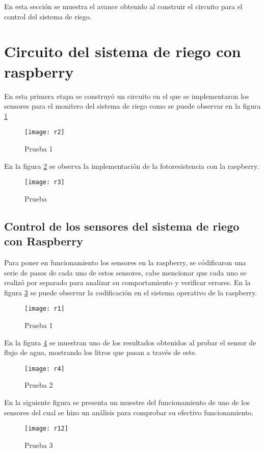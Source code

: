 En esta secci\'on se muestra el avance obtenido al construir el circuito para el control del sistema de riego.
\section{Circuito del sistema de riego con raspberry}
En esta primera etapa se construy\'o un circuito en el que se implementaron los sensores para el monitero del sistema de riego como se puede observar en la figura \ref{r2}

\begin{figure}[H]
	\begin{center}
		\texttt{[image: r2]}
	\end{center}
	\caption{Prueba 1}
	\label{r2}
\end{figure} 

En la figura \ref{r3} se observa la implementaci\'on de la fotoresistencia con la raspberry. 
\begin{figure}[H]
	\begin{center}
		\texttt{[image: r3]}
	\end{center}
	\caption{Prueba}
	\label{r3}
\end{figure} 


\subsection{Control de los sensores del sistema de riego con Raspberry}
Para poner en funcionamiento los sensores en la raspberry, se c\'odificaron una serie de pasos de cada uno de estos sensores, cabe mencionar que cada uno se realiz\'o por separado para analizar su comportamiento y verificar errores. En la figura \ref{r1} se puede observar la codificaci\'on en el sistema operativo de la raspberry.
\begin{figure}[H]
\begin{center}
	\texttt{[image: r1]}
\end{center}
	\caption{Prueba 1}
	\label{r1}
\end{figure} 

En la figura \ref{r4} se muestran uno de los resultados obtenidos al probar el sensor de flujo de agua, mostrando los litros que pasan a trav\'es de este. 
\begin{figure}[H]
	\begin{center}
		\texttt{[image: r4]}
	\end{center}
	\caption{Prueba 2}
	\label{r4}
\end{figure} 

En la siguiente figura se presenta un muestre del funcionamiento de uno de los sensores del cual se hizo un an\'alisis para comprobar su efectivo funcionamiento.
\begin{figure}[H]
	\begin{center}
		\texttt{[image: r12]}
	\end{center}
	\caption{Prueba 3}
	\label{r12}
\end{figure} 


